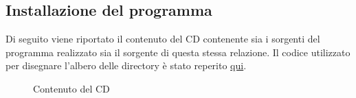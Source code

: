 \documentclass[paper=a4, oneside, fontsize=14pt, titlepage]{article}
\begin{document}
		\subsection{Installazione del programma}
			\begin{flushleft}
				Di seguito viene riportato il contenuto del CD contenente sia i sorgenti del programma realizzato sia il sorgente di questa stessa relazione. Il codice utilizzato per disegnare l'albero delle directory è stato reperito 
				\href{https://tex.stackexchange.com/questions/5073/making-a-simple-directory-tree}{qui}.
			\end{flushleft}
			\begin{center}
				\begin{figure}
				\caption{Contenuto del CD}
				\end{figure}
			\end{center}
\end{document}
